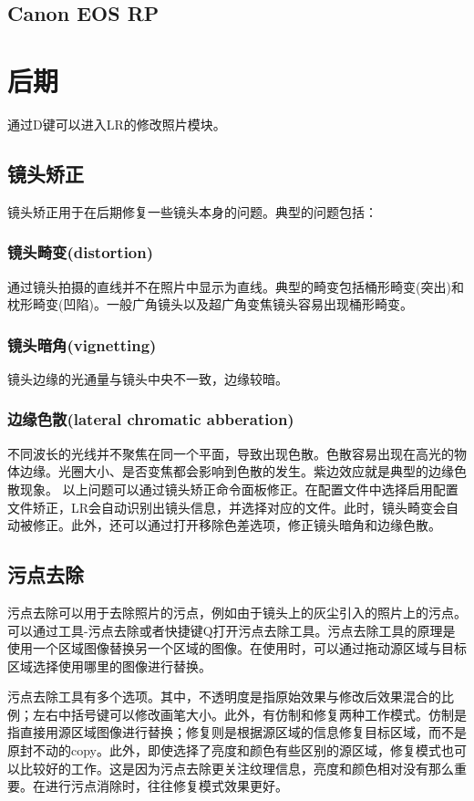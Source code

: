 \documentclass{ctexart}
\begin{document}
\subsection{Canon EOS RP}

\section{后期}
通过D键可以进入LR的修改照片模块。
\subsection{镜头矫正}
镜头矫正用于在后期修复一些镜头本身的问题。典型的问题包括：
\subsubsection{镜头畸变(distortion)}
通过镜头拍摄的直线并不在照片中显示为直线。典型的畸变包括桶形畸变(突出)和枕形畸变(凹陷)。一般广角镜头以及超广角变焦镜头容易出现桶形畸变。
\subsubsection{镜头暗角(vignetting)}
镜头边缘的光通量与镜头中央不一致，边缘较暗。
\subsubsection{边缘色散(lateral chromatic abberation)}
不同波长的光线并不聚焦在同一个平面，导致出现色散。色散容易出现在高光的物体边缘。光圈大小、是否变焦都会影响到色散的发生。紫边效应就是典型的边缘色散现象。
以上问题可以通过镜头矫正命令面板修正。在配置文件中选择启用配置文件矫正，LR会自动识别出镜头信息，并选择对应的文件。此时，镜头畸变会自动被修正。此外，还可以通过打开移除色差选项，修正镜头暗角和边缘色散。
\subsection{污点去除}
污点去除可以用于去除照片的污点，例如由于镜头上的灰尘引入的照片上的污点。可以通过工具-污点去除或者快捷键Q打开污点去除工具。污点去除工具的原理是使用一个区域图像替换另一个区域的图像。在使用时，可以通过拖动源区域与目标区域选择使用哪里的图像进行替换。

污点去除工具有多个选项。其中，不透明度是指原始效果与修改后效果混合的比例；左右中括号键可以修改画笔大小。此外，有仿制和修复两种工作模式。仿制是指直接用源区域图像进行替换；修复则是根据源区域的信息修复目标区域，而不是原封不动的copy。此外，即使选择了亮度和颜色有些区别的源区域，修复模式也可以比较好的工作。这是因为污点去除更关注纹理信息，亮度和颜色相对没有那么重要。在进行污点消除时，往往修复模式效果更好。
\end{document}
